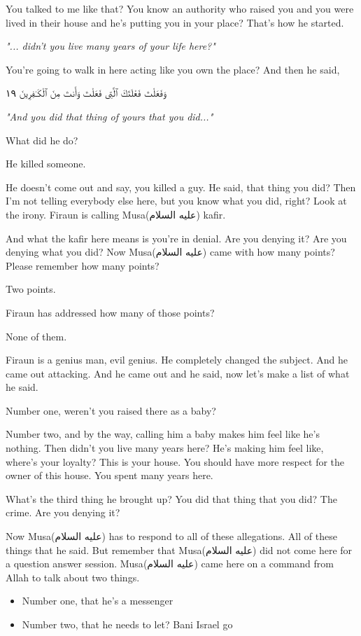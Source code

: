 \documentclass[12pt]{article}
\newcommand{\as}{\textarabic{(عليه السلام)}}
\begin{document}
You talked to me like that? You know an authority who raised you and you were lived in their house and he's putting you in your place? That's how he started. 

\textit{"... didn't you live many years of your life here?"}

You're going to walk in here acting like you own the place? And then he said, 

\textarabic{وَفَعَلْتَ فَعْلَتَكَ ٱلَّتِى فَعَلْتَ وَأَنتَ مِنَ ٱلْكَـٰفِرِينَ ١٩}

\textit{"And you did that thing of yours that you did..."}

What did he do? 

He killed someone. 

He doesn't come out and say, you killed a guy. He said, that thing you did? Then I'm not telling everybody else here, but you know what you did, right? Look at the irony. Firaun is calling Musa\as{} kafir. 

And what the kafir here means is you're in denial. Are you denying it? Are you denying what you did? Now Musa\as{} came with how many points? Please remember how many points? 

Two points. 

Firaun has addressed how many of those points? 

None of them. 

Firaun is a genius man, evil genius. He completely changed the subject. And he came out attacking. And he came out and he said, now let's make a list of what he said. 

Number one, weren't you raised there as a baby? 

Number two, and by the way, calling him a baby makes him feel like he's nothing. Then didn't you live many years here? He's making him feel like, where's your loyalty? This is your house. You should have more respect for the owner of this house. You spent many years here. 

What's the third thing he brought up? You did that thing that you did? The crime. Are you denying it? 

Now Musa\as{} has to respond to all of these allegations. All of these things that he said. But remember that Musa\as{} did not come here for a question answer session. Musa\as{} came here on a command from Allah to talk about two things. 

\begin{itemize}
    \item Number one, that he's a messenger
    \item Number two, that he needs to let? Bani Israel go
\end{itemize}
\end{document}
